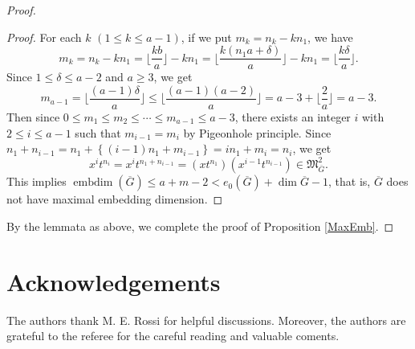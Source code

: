 \documentclass[12pt]{amsart}
\theoremstyle{definition}
\theoremstyle{remark}
\numberwithin{equation}{section}
\DeclareMathOperator{\emb}{embdim}
\newcommand{\MM}{\mathfrak M}
\begin{document}
\begin{proof}
\begin{proof}
For each $k$ $(1 \le k \le a-1)$, if we put $m_k=n_k-kn_1$, we have 
\[
m_k= n_{k}-kn_1 =\lfloor \frac{kb}{a} \rfloor -kn_1
=\lfloor \frac{k(n_1a+\delta)}{a} \rfloor -kn_1
=\lfloor \frac{k \delta}{a} \rfloor. 
\]
Since $1 \le \delta \le a-2$ and $a \ge 3$, we get 
\[
m_{a-1} = \lfloor \frac{(a-1)\delta}{a} \rfloor
\le \lfloor \frac{(a-1)(a-2)}{a} \rfloor
=a-3+ \lfloor \frac{2}{a} \rfloor=a-3. 
\]
Then since $0 \le m_1 \le m_2 \le \cdots \le m_{a-1} \le a-3$, 
there exists an integer $i$ with $2 \le i \le a-1$ such that 
$m_{i-1}=m_i$ by Pigeonhole principle. 
Since $n_1+n_{i-1}=n_1+\left\{(i-1)n_1+m_{i-1} \right\} = in_1+m_i=n_i$, 
we get
\[
x^it^{n_i} = x^it^{n_1+n_{i-1}}=(xt^{n_1})(x^{i-1}t^{n_{i-1}}) \in \MM_{\overline{G}}^2. 
\]
This implies $\emb(\overline{G}) \le a+m-2 < e_0(\overline{G})+\dim \overline{G}-1$, 
that is, $\overline{G}$ does not have maximal embedding dimension. 
\end{proof}

\par \vspace{3mm}
By the lemmata as above, we complete the proof of Proposition \ref{MaxEmb}. 
\end{proof}




\section*{Acknowledgements}
The authors thank M. E. Rossi for helpful discussions.
Moreover, the authors are grateful to the referee for the careful reading and valuable coments.  






\end{document}

